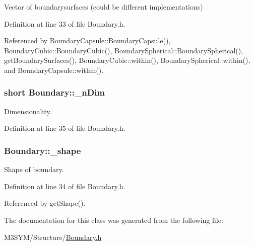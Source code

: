 Vector of boundarysurfaces (could be different implementations) 



Definition at line 33 of file Boundary.\+h.



Referenced by Boundary\+Capsule\+::\+Boundary\+Capsule(), Boundary\+Cubic\+::\+Boundary\+Cubic(), Boundary\+Spherical\+::\+Boundary\+Spherical(), get\+Boundary\+Surfaces(), Boundary\+Cubic\+::within(), Boundary\+Spherical\+::within(), and Boundary\+Capsule\+::within().

\hypertarget{classBoundary_a96f2294e0c822ab216fe5ab7e17258c7}{
\subsubsection[{\+\_\+n\+Dim}]{\setlength{\rightskip}{0pt plus 5cm}short Boundary\+::\+\_\+n\+Dim\hspace{0.3cm}{\ttfamily [protected]}}}\label{classBoundary_a96f2294e0c822ab216fe5ab7e17258c7}


Dimensionality. 



Definition at line 35 of file Boundary.\+h.

\hypertarget{classBoundary_a04c10c9a7aea1924d779d392e29f94ff}{
\subsubsection[{\+\_\+shape}]{ Boundary\+::\+\_\+shape\hspace{0.3cm}{\ttfamily [protected]}}}\label{classBoundary_a04c10c9a7aea1924d779d392e29f94ff}


Shape of boundary. 



Definition at line 34 of file Boundary.\+h.



Referenced by get\+Shape().



The documentation for this class was generated from the following file\+:\begin{DoxyCompactItemize}
\item 
M3\+S\+Y\+M/\+Structure/\hyperlink{Boundary_8h}{Boundary.\+h}\end{DoxyCompactItemize}
